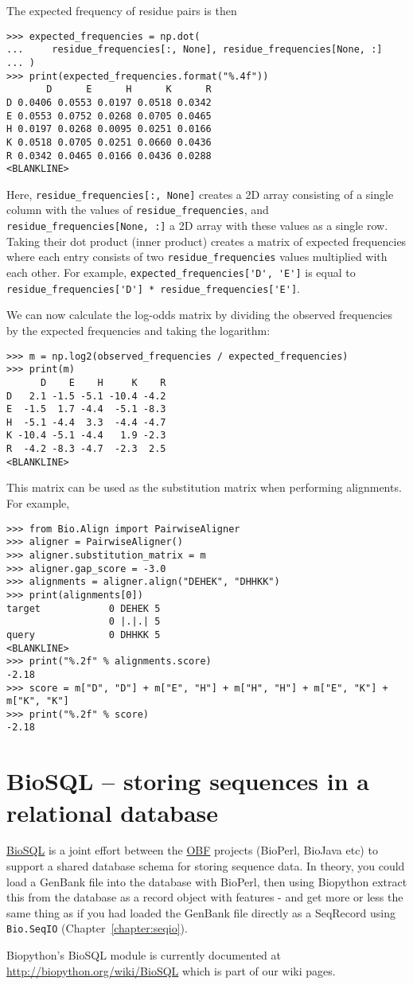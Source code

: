 The expected frequency of residue pairs is then
\begin{verbatim}
>>> expected_frequencies = np.dot(
...     residue_frequencies[:, None], residue_frequencies[None, :]
... )
>>> print(expected_frequencies.format("%.4f"))
       D      E      H      K      R
D 0.0406 0.0553 0.0197 0.0518 0.0342
E 0.0553 0.0752 0.0268 0.0705 0.0465
H 0.0197 0.0268 0.0095 0.0251 0.0166
K 0.0518 0.0705 0.0251 0.0660 0.0436
R 0.0342 0.0465 0.0166 0.0436 0.0288
<BLANKLINE>
\end{verbatim}
Here, \verb+residue_frequencies[:, None]+ creates a 2D array consisting of a single column with the values of \verb+residue_frequencies+, and \verb+residue_frequencies[None, :]+ a 2D array with these values as a single row. Taking their dot product (inner product) creates a matrix of expected frequencies where each entry consists of two \verb+residue_frequencies+ values multiplied with each other. For example, \verb+expected_frequencies['D', 'E']+ is equal to \verb+residue_frequencies['D'] * residue_frequencies['E']+.

We can now calculate the log-odds matrix by dividing the observed frequencies by the expected frequencies and taking the logarithm:
\begin{verbatim}
>>> m = np.log2(observed_frequencies / expected_frequencies)
>>> print(m)
      D    E    H     K    R
D   2.1 -1.5 -5.1 -10.4 -4.2
E  -1.5  1.7 -4.4  -5.1 -8.3
H  -5.1 -4.4  3.3  -4.4 -4.7
K -10.4 -5.1 -4.4   1.9 -2.3
R  -4.2 -8.3 -4.7  -2.3  2.5
<BLANKLINE>
\end{verbatim}

This matrix can be used as the substitution matrix when performing alignments. For example,
\begin{verbatim}
>>> from Bio.Align import PairwiseAligner
>>> aligner = PairwiseAligner()
>>> aligner.substitution_matrix = m
>>> aligner.gap_score = -3.0
>>> alignments = aligner.align("DEHEK", "DHHKK")
>>> print(alignments[0])
target            0 DEHEK 5
                  0 |.|.| 5
query             0 DHHKK 5
<BLANKLINE>
>>> print("%.2f" % alignments.score)
-2.18
>>> score = m["D", "D"] + m["E", "H"] + m["H", "H"] + m["E", "K"] + m["K", "K"]
>>> print("%.2f" % score)
-2.18
\end{verbatim}


\section{BioSQL -- storing sequences in a relational database}
\label{sec:BioSQL}
\href{https://www.biosql.org/}{BioSQL} is a joint effort between the
\href{https://www.open-bio.org/wiki/Main_Page}{OBF} projects (BioPerl, BioJava etc) to support a
shared database schema for storing sequence data. In theory, you could load a
GenBank file into the database with BioPerl, then using Biopython extract this
from the database as a record object with features - and get more or less the same
thing as if you had loaded the GenBank file directly as a SeqRecord using
\verb|Bio.SeqIO| (Chapter~\ref{chapter:seqio}).

Biopython's BioSQL module is currently documented at
\url{http://biopython.org/wiki/BioSQL} which is part of our wiki pages.
